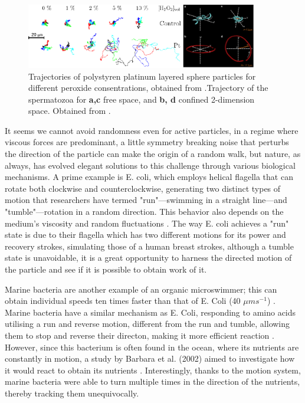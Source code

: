 \begin{figure}[h]
  \begin{center}
    \includegraphics[width=0.90\textwidth]{figures/randomwalk.pdf}
  \end{center}
  \caption[Random Walk for active brownian particles.]{Trajectories of polystyren platinum layered sphere particles for different peroxide consentrations, obtained from \cite{howse2007self}.Trajectory of the spermatozoa for \textbf{a,c} free space, and \textbf{b, d} confined 2-dimension space. Obtained from \cite{corkidi2008tracking}.}\label{fig:corkidiexperiment}
\end{figure}



It seems we cannot avoid randomness even for active particles, in a regime where viscous forces are predominant, a little symmetry breaking noise that perturbs the direction of the particle can make the origin of a random walk, but nature, as always, has evolved elegant solutions to this challenge through various biological mechanisms. A prime example is E. coli, which employs helical flagella that can rotate both clockwise and counterclockwise, generating two distinct types of motion that researchers have termed "run"—swimming in a straight line—and "tumble"—rotation in a random direction. This behavior also depends on the medium's viscosity and random fluctuations \cite{kumar2010physics}. The way E. coli achieves a "run" state is due to their flagella which has two different motions for its power and recovery strokes, simulating those of a human breast strokes, although a tumble state is unavoidable, it is a great opportunity to harness the directed motion of the particle and see if it is possible to obtain work of it. 


Marine bacteria are another example of an organic microswimmer; this can obtain individual speeds ten times faster than that of E. Coli (40 $\mu m s^{-1}$) \cite{mitchell1995long, lowe1987rapid}. Marine bacteria have a similar mechanism as E. Coli, responding to amino acids utilising a run and reverse motion, different from the run and tumble, allowing them to stop and reverse their directon, making it more efficient reaction \cite{barbara2003marine}. However, since this bacterium is often found in the ocean, where its nutrients are constantly in motion, a study by Barbara et al. (2002) aimed to investigate how it would react to obtain its nutrients \cite{barbara2003bacterial}. Interestingly, thanks to the motion system, marine bacteria were able to turn multiple times in the direction of the nutrients, thereby tracking them unequivocally.


